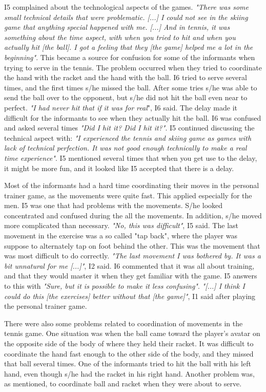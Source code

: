 I5 complained about the technological aspects of the games. \emph{"There was some small technical details that were problematic. [...] I could not see in the skiing game that anything special happened with me. [...] And in tennis, it was something about the time aspect, with when you tried to hit and when you actually hit [the ball]. I got a feeling that they [the game] helped me a lot in the beginning"}. This became a source for confusion for some of the informants when trying to serve in the tennis. The problem occurred when they tried to coordinate the hand with the racket and the hand with the ball. I6 tried to serve several times, and the first times s/he missed the ball. After some tries s/he was able to send the ball over to the opponent, but s/he did not hit the ball even near to perfect. \emph{"I had never hit that if it was for real}", I6 said. The delay made it difficult for the informants to see when they actually hit the ball. I6 was confused and asked several times \emph{"Did I hit it? Did I hit it?"}. I5 continued discussing the technical aspect with: \emph{"I experienced the tennis and skiing game as games with lack of technical perfection. It was not good enough technically to make a real time experience"}. I5 mentioned several times that when you get use to the delay, it might be more fun, and it looked like I5 accepted that there is a delay. 

Most of the informants had a hard time coordinating their moves in the personal trainer game, as the movements were quite fast. This applied especially for the men. I5 was one that had problems with the movements. S/he looked concentrated and confused during the all the movements. In addition, s/he moved more complicated than necessary. \emph{"No, this was difficult"}, I5 said. The last movement in the exercise was a so called "tap back", where the player was suppose to alternately tap on foot behind the other. This was the movement that was most difficult to do correctly. \emph{"The last movement I was bothered by. It was a bit unnatural for me [...]"}, I2 said. I6 commented that it was all about training, and that they would master it when they get familiar with the game. I5 answers to this with \emph{"Sure, but it is possible to make it less confusing"}. \emph{"[...] I think I could do this [the exercises] better without that [the game]"}, I1 said after playing the personal trainer game. 

There were also some problems related to coordination of movements in the tennis game. One situation was when the ball came toward the player's avatar on the opposite side of the body of where they held their racket. It was difficult to coordinate the hand fast enough to the other side of the body, and they missed that ball several times. One of the informants tried to hit the ball with his left hand, even though s/he had the racket in his right hand. Another problem was, as mentioned, to coordinate ball and racket when they were about to serve. 

